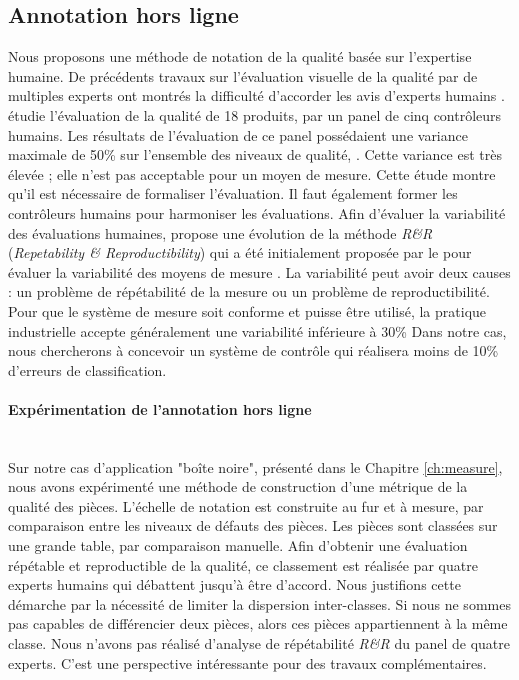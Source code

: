 \subsection{Annotation hors ligne}
Nous proposons une méthode de notation de la qualité basée sur l'expertise humaine.
De précédents travaux sur l'évaluation visuelle de la qualité par de multiples experts ont montrés la difficulté d'accorder les avis d'experts humains \cite{baudet_visual_2011}.
\citeauthor{baudet_visual_2011} étudie l'évaluation de la qualité de 18 produits, par un panel de cinq contrôleurs humains.
Les résultats de l'évaluation de ce panel possédaient une variance maximale de 50\% sur l'ensemble des niveaux de qualité, .
Cette variance est très élevée ; elle n'est pas acceptable pour un moyen de mesure.
Cette étude montre qu'il est nécessaire de formaliser l'évaluation.
Il faut également former les contrôleurs humains pour harmoniser les évaluations.
Afin d'évaluer la variabilité des évaluations humaines,  \citeauthor{baudet_maitrise_2012} \cite{baudet_maitrise_2012} propose une évolution de la méthode \textit{R\&R} (\textit{Repetability \& Reproductibility}) qui a été initialement proposée par le \citeauthor{automotiveindustryactiongroup_measurement_2010} pour évaluer la variabilité des moyens de mesure \cite{automotiveindustryactiongroup_measurement_2010}.
La variabilité peut avoir deux causes : un problème de répétabilité de la mesure ou un problème de reproductibilité.
Pour que le système de mesure soit conforme et puisse être utilisé, la pratique industrielle accepte généralement une variabilité inférieure à 30\%
Dans notre cas, nous chercherons à concevoir un système de contrôle qui réalisera moins de 10\% d'erreurs de classification.

\paragraph{Expérimentation de l'annotation hors ligne}\mbox{} \label{parag:offline_annotation} \\
Sur notre cas d'application "boîte noire", présenté dans le Chapitre \ref{ch:measure}, nous avons expérimenté une méthode de construction d'une métrique de la qualité des pièces.
L'échelle de notation est construite au fur et à mesure, par comparaison entre les niveaux de défauts des pièces.
Les pièces sont classées sur une grande table, par comparaison manuelle.
Afin d'obtenir une évaluation répétable et reproductible de la qualité, ce classement est réalisée par quatre experts humains qui débattent jusqu'à être d'accord.
Nous justifions cette démarche par la nécessité de limiter la dispersion inter-classes.
Si nous ne sommes pas capables de différencier deux pièces, alors ces pièces appartiennent à la même classe.
Nous n'avons pas réalisé d'analyse de répétabilité \textit{R\&R} du panel de quatre experts.
C'est une perspective intéressante pour des travaux complémentaires.

